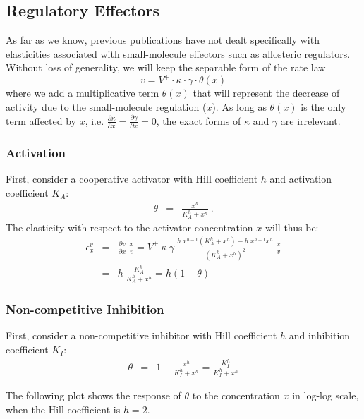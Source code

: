 \documentclass[12pt,a4paper]{article}
\begin{document}
\subsection{Regulatory Effectors}
As far as we know, previous publications have not dealt specifically with elasticities associated with small-molecule effectors such as allosteric regulators. Without loss of generality, we will keep the separable form of the rate law
\[v = V^+ \cdot \kappa \cdot \gamma \cdot \theta(x)\]
where we add a multiplicative term $\theta(x)$ that will represent the decrease of activity due to the small-molecule regulation ($x$). As long as $\theta(x)$ is the only term affected by $x$, i.e. $\frac{\partial \kappa}{\partial x} = \frac{\partial \gamma}{\partial x} = 0$, the exact forms of $\kappa$ and $\gamma$ are irrelevant.

\subsubsection{Activation}
First, consider a cooperative \cite{Barcroft1910-rx, Monod1965-dq} activator with Hill coefficient $h$ and activation coefficient $K_A$:
\begin{eqnarray}
    \theta &=& \frac{x^h}{K_A^h + x^h}~.
\end{eqnarray}
The elasticity with respect to the activator concentration $x$ will thus be:
\begin{eqnarray}
    \epsilon_x^v &=& \frac{\partial v}{\partial x} ~ \frac{x}{v} = V^+ ~ \kappa ~ \gamma ~ \frac{h~x^{h-1} (K_A^h + x^h) - h~x^{h-1} x^h}{(K_A^h + x^h)^2}~\frac{x}{v} \nonumber \\
    &=& h~\frac{K_A^h}{K_A^h + x^h} = h (1 - \theta) \label{eq:eps_act}
\end{eqnarray}

\subsubsection{Non-competitive Inhibition}
First, consider a non-competitive inhibitor with Hill coefficient $h$ and inhibition coefficient $K_I$:
\begin{eqnarray}
    \theta &=& 1 - \frac{x^h}{K_I^h + x^h} = \frac{K_I^h}{K_I^h + x^h}
\end{eqnarray}

The following plot shows the response of $\theta$ to the concentration $x$ in log-log scale, when the Hill coefficient is $h = 2$.

\begin{center}
\end{center}
\end{document}
